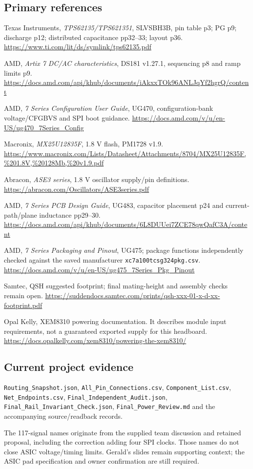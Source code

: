 \documentclass[11pt,a4paper]{article}
\begin{document}
\subsection{Primary references}
\begingroup\small\begin{enumerate}[label={[\arabic*]},leftmargin=8mm,itemsep=3pt]
\item Texas Instruments, \emph{TPS62135/TPS621351}, SLVSBH3B, pin table p3; PG p9; discharge p12; distributed capacitance pp32--33; layout p36. \url{https://www.ti.com/lit/ds/symlink/tps62135.pdf}
\item AMD, \emph{Artix 7 DC/AC characteristics}, DS181 v1.27.1, sequencing p8 and ramp limits p9. \url{https://docs.amd.com/api/khub/documents/iAkxxTOk96ANLJqYf2hgrQ/content}
\item AMD, \emph{7 Series Configuration User Guide}, UG470, configuration-bank voltage/CFGBVS and SPI boot guidance. \url{https://docs.amd.com/v/u/en-US/ug470_7Series_Config}
\item Macronix, \emph{MX25U12835F}, 1.8 V flash, PM1728 v1.9. \url{https://www.macronix.com/Lists/Datasheet/Attachments/8704/MX25U12835F,%201.8V,%20128Mb,%20v1.9.pdf}
\item Abracon, \emph{ASE3 series}, 1.8 V oscillator supply/pin definitions. \url{https://abracon.com/Oscillators/ASE3series.pdf}
\item AMD, \emph{7 Series PCB Design Guide}, UG483, capacitor placement p24 and current-path/plane inductance pp29--30. \url{https://docs.amd.com/api/khub/documents/6L8DUUei7ZCE78qwQafC3A/content}
\item AMD, \emph{7 Series Packaging and Pinout}, UG475; package functions independently checked against the saved manufacturer \nolinkurl{xc7a100tcsg324pkg.csv}. \url{https://docs.amd.com/v/u/en-US/ug475_7Series_Pkg_Pinout}
\item Samtec, QSH suggested footprint; final mating-height and assembly checks remain open. \url{https://suddendocs.samtec.com/prints/qsh-xxx-01-x-d-xx-footprint.pdf}
\item Opal Kelly, XEM8310 powering documentation. It describes module input requirements, not a guaranteed exported supply for this headboard. \url{https://docs.opalkelly.com/xem8310/powering-the-xem8310/}
\end{enumerate}\endgroup
\subsection{Current project evidence}
\nolinkurl{Routing_Snapshot.json}, \nolinkurl{All_Pin_Connections.csv}, \nolinkurl{Component_List.csv}, \nolinkurl{Net_Endpoints.csv}, \nolinkurl{Final_Independent_Audit.json}, \nolinkurl{Final_Rail_Invariant_Check.json}, \nolinkurl{Final_Power_Review.md} and the accompanying source/readback records.

The 117-signal names originate from the supplied team discussion and retained proposal, including the correction adding four SPI clocks. Those names do not close ASIC voltage/timing limits. Gerald's slides remain supporting context; the ASIC pad specification and owner confirmation are still required.
\end{document}

